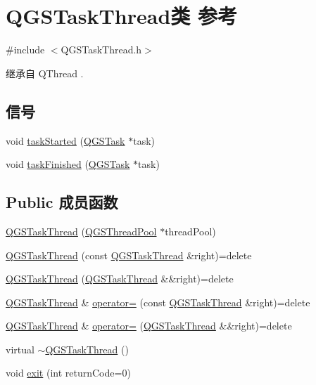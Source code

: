 \hypertarget{class_q_g_s_task_thread}{}\section{Q\+G\+S\+Task\+Thread类 参考}
\label{class_q_g_s_task_thread}


{\ttfamily \#include $<$Q\+G\+S\+Task\+Thread.\+h$>$}



继承自 Q\+Thread .

\subsection*{信号}
\begin{DoxyCompactItemize}
\item 
void \mbox{\hyperlink{class_q_g_s_task_thread_af0b8aba84fccadfded082f7f01dfe6d2}{task\+Started}} (\mbox{\hyperlink{class_q_g_s_task}{Q\+G\+S\+Task}} $\ast$task)
\item 
void \mbox{\hyperlink{class_q_g_s_task_thread_aff58714c3d2f405e35027ad7d4edf405}{task\+Finished}} (\mbox{\hyperlink{class_q_g_s_task}{Q\+G\+S\+Task}} $\ast$task)
\end{DoxyCompactItemize}
\subsection*{Public 成员函数}
\begin{DoxyCompactItemize}
\item 
\mbox{\hyperlink{class_q_g_s_task_thread_a09b030f627c2671cd7a241993afdf4f8}{Q\+G\+S\+Task\+Thread}} (\mbox{\hyperlink{class_q_g_s_thread_pool}{Q\+G\+S\+Thread\+Pool}} $\ast$thread\+Pool)
\item 
\mbox{\hyperlink{class_q_g_s_task_thread_a3d2d0d8b1467579ae8e1742db33d52b0}{Q\+G\+S\+Task\+Thread}} (const \mbox{\hyperlink{class_q_g_s_task_thread}{Q\+G\+S\+Task\+Thread}} \&right)=delete
\item 
\mbox{\hyperlink{class_q_g_s_task_thread_abf701b29ec35641ada10c8060384c4c8}{Q\+G\+S\+Task\+Thread}} (\mbox{\hyperlink{class_q_g_s_task_thread}{Q\+G\+S\+Task\+Thread}} \&\&right)=delete
\item 
\mbox{\hyperlink{class_q_g_s_task_thread}{Q\+G\+S\+Task\+Thread}} \& \mbox{\hyperlink{class_q_g_s_task_thread_adaa98adce8918c55d19f6b03c65bba53}{operator=}} (const \mbox{\hyperlink{class_q_g_s_task_thread}{Q\+G\+S\+Task\+Thread}} \&right)=delete
\item 
\mbox{\hyperlink{class_q_g_s_task_thread}{Q\+G\+S\+Task\+Thread}} \& \mbox{\hyperlink{class_q_g_s_task_thread_a3141da08b3509568dc71c902dacd4527}{operator=}} (\mbox{\hyperlink{class_q_g_s_task_thread}{Q\+G\+S\+Task\+Thread}} \&\&right)=delete
\item 
virtual \mbox{\hyperlink{class_q_g_s_task_thread_a461b6611546c066275fc193f376536f5}{$\sim$\+Q\+G\+S\+Task\+Thread}} ()
\item 
void \mbox{\hyperlink{class_q_g_s_task_thread_a7080c9fd981e5b393ca5b5920aa0f7cd}{exit}} (int return\+Code=0)
\end{DoxyCompactItemize}
